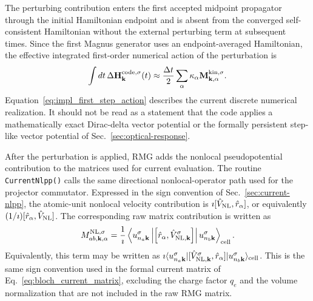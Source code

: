 The perturbing contribution enters the first accepted midpoint
propagator through the initial Hamiltonian endpoint and is absent from
the converged self-consistent Hamiltonian without the external
perturbing term at subsequent times.  Since the first Magnus generator
uses an endpoint-averaged Hamiltonian, the effective integrated
first-order numerical action of the perturbation is
\begin{equation}
  \int dt\,
  \Delta\mathbf H_{\mathbf k}^{\rm code,\sigma}(t)
  \approx
  \frac{\Delta t}{2}
  \sum_\alpha
  \kappa_\alpha
  \mathbf M_{\mathbf k,\alpha}^{\rm kin,\sigma}.
  \label{eq:impl_first_step_action}
\end{equation}
Equation~\eqref{eq:impl_first_step_action} describes the current
discrete numerical realization.  It should not be read as a statement
that the code applies a mathematically exact Dirac-delta vector
potential or the formally persistent step-like vector potential of
Sec.~\ref{sec:optical-response}.

After the perturbation is applied, RMG adds the nonlocal
pseudopotential contribution to the matrices used for current
evaluation.  The routine \texttt{CurrentNlpp()} calls the same
directional nonlocal-operator path used for the projector commutator.
Expressed in the sign convention of Sec.~\ref{sec:current-nlpp}, the
atomic-unit nonlocal velocity contribution is
$\imath[\hat V_{\rm NL},\hat r_\alpha]$, or equivalently
$(1/\imath)[\hat r_\alpha,\hat V_{\rm NL}]$.  The corresponding raw
matrix contribution is written as
\begin{equation}
  M_{ab,\mathbf k,\alpha}^{\rm NL,\sigma}
  =
  \frac{1}{\imath}
  \left\langle
    u_{n_a\mathbf k}^{\sigma}
    \left|
    \left[
      \hat r_\alpha,\hat V_{{\rm NL},\mathbf k}^{\sigma}
    \right]
    \right|
    u_{n_b\mathbf k}^{\sigma}
  \right\rangle_{\rm cell}.
  \label{eq:impl_mnl}
\end{equation}
Equivalently, this term may be written as
$\imath\langle u_{n_a\mathbf k}^{\sigma}|
[\hat V_{{\rm NL},\mathbf k}^{\sigma},\hat r_\alpha]
|u_{n_b\mathbf k}^{\sigma}\rangle_{\rm cell}$.
This is the same sign convention used in the formal current matrix of
Eq.~\eqref{eq:bloch_current_matrix}, excluding the charge factor
$q_e$ and the volume normalization that are not included in the raw
RMG matrix.

